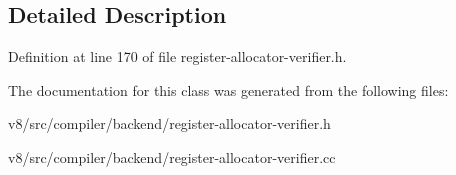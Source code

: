 \subsection{Detailed Description}


Definition at line 170 of file register-\/allocator-\/verifier.\+h.



The documentation for this class was generated from the following files\+:\begin{DoxyCompactItemize}
\item 
v8/src/compiler/backend/register-\/allocator-\/verifier.\+h\item 
v8/src/compiler/backend/register-\/allocator-\/verifier.\+cc\end{DoxyCompactItemize}

